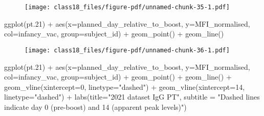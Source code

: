 \documentclass[
  letterpaper,
  DIV=11,
  numbers=noendperiod]{scrartcl}
\newenvironment{Shaded}{\begin{snugshade}}{\end{snugshade}}
\newcommand{\AttributeTok}[1]{\textcolor[rgb]{0.40,0.45,0.13}{#1}}
\newcommand{\DecValTok}[1]{\textcolor[rgb]{0.68,0.00,0.00}{#1}}
\newcommand{\FloatTok}[1]{\textcolor[rgb]{0.68,0.00,0.00}{#1}}
\newcommand{\FunctionTok}[1]{\textcolor[rgb]{0.28,0.35,0.67}{#1}}
\newcommand{\NormalTok}[1]{\textcolor[rgb]{0.00,0.23,0.31}{#1}}
\newcommand{\SpecialCharTok}[1]{\textcolor[rgb]{0.37,0.37,0.37}{#1}}
\newcommand{\StringTok}[1]{\textcolor[rgb]{0.13,0.47,0.30}{#1}}
\begin{document}
\begin{figure}[H]

{\centering \texttt{[image: class18\_files/figure-pdf/unnamed-chunk-35-1.pdf]}

}

\end{figure}

\begin{Shaded}
\begin{Highlighting}[]
\FunctionTok{ggplot}\NormalTok{(pt}\FloatTok{.21}\NormalTok{) }\SpecialCharTok{+}
  \FunctionTok{aes}\NormalTok{(}\AttributeTok{x=}\NormalTok{planned\_day\_relative\_to\_boost,}
        \AttributeTok{y=}\NormalTok{MFI\_normalised,}
        \AttributeTok{col=}\NormalTok{infancy\_vac,}
        \AttributeTok{group=}\NormalTok{subject\_id) }\SpecialCharTok{+}
  \FunctionTok{geom\_point}\NormalTok{() }\SpecialCharTok{+}
  \FunctionTok{geom\_line}\NormalTok{()}
\end{Highlighting}
\end{Shaded}

\begin{figure}[H]

{\centering \texttt{[image: class18\_files/figure-pdf/unnamed-chunk-36-1.pdf]}

}

\end{figure}

\begin{Shaded}
\begin{Highlighting}[]
\FunctionTok{ggplot}\NormalTok{(pt}\FloatTok{.21}\NormalTok{) }\SpecialCharTok{+}
  \FunctionTok{aes}\NormalTok{(}\AttributeTok{x=}\NormalTok{planned\_day\_relative\_to\_boost,}
        \AttributeTok{y=}\NormalTok{MFI\_normalised,}
        \AttributeTok{col=}\NormalTok{infancy\_vac,}
        \AttributeTok{group=}\NormalTok{subject\_id) }\SpecialCharTok{+}
  \FunctionTok{geom\_point}\NormalTok{() }\SpecialCharTok{+}
  \FunctionTok{geom\_line}\NormalTok{() }\SpecialCharTok{+}
  \FunctionTok{geom\_vline}\NormalTok{(}\AttributeTok{xintercept=}\DecValTok{0}\NormalTok{, }\AttributeTok{linetype=}\StringTok{"dashed"}\NormalTok{) }\SpecialCharTok{+}
  \FunctionTok{geom\_vline}\NormalTok{(}\AttributeTok{xintercept=}\DecValTok{14}\NormalTok{, }\AttributeTok{linetype=}\StringTok{"dashed"}\NormalTok{) }\SpecialCharTok{+}
  \FunctionTok{labs}\NormalTok{(}\AttributeTok{title=}\StringTok{"2021 dataset IgG PT"}\NormalTok{,}
       \AttributeTok{subtitle =} \StringTok{"Dashed lines indicate day 0 (pre{-}boost) and 14 (apparent peak levels)"}\NormalTok{)}
\end{Highlighting}
\end{Shaded}
\end{document}
